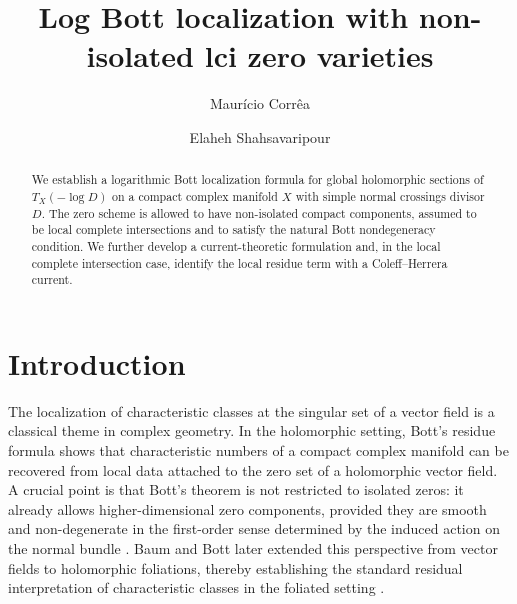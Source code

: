 \documentclass[12pt,a4paper,dvipsnames,x11names]{amsart}
\numberwithin{equation}{section}
\theoremstyle{plain}
\theoremstyle{definition}
\theoremstyle{remark}
\begin{document}

\title[Log Bott localization with non-isolated lci zero varieties]{Log Bott localization with non-isolated lci zero varieties}

\author{Maur\'icio Corr\^ea}
\address{Maur\'icio Corr\^ea\\
Universit\`a degli Studi di Bari\\
Via E. Orabona 4, I-70125 Bari, Italy}

\author{Elaheh Shahsavaripour}
\address{Elaheh Shahsavaripour\\
Universit\`a degli Studi di Bari\\
Via E. Orabona 4, I-70125 Bari, Italy}

\date{}

\begin{abstract}
We establish a logarithmic Bott localization formula for global holomorphic sections of $T_X(-\log D)$ on a compact complex manifold $X$ with simple normal crossings divisor $D$. The zero scheme is allowed to have non-isolated compact components, assumed to be local complete intersections and to satisfy the natural Bott nondegeneracy condition. We further develop a current-theoretic formulation and, in the local complete intersection case, identify the local residue term with a Coleff--Herrera current.
\end{abstract}

\maketitle
 

\section{Introduction}\label{sec:intro}

The localization of characteristic classes at the singular set of a vector field is a classical theme in complex geometry. In the holomorphic setting, Bott's residue formula shows that characteristic numbers of a compact complex manifold can be recovered from local data attached to the zero set of a holomorphic vector field. A crucial point is that Bott's theorem is not restricted to isolated zeros: it already allows higher-dimensional zero components, provided they are smooth and non-degenerate in the first-order sense determined by the induced action on the normal bundle \cite{Bott67b}. Baum and Bott later extended this perspective from vector fields to holomorphic foliations, thereby establishing the standard residual interpretation of characteristic classes in the foliated setting \cite{BaumBott72}.
\end{document}
